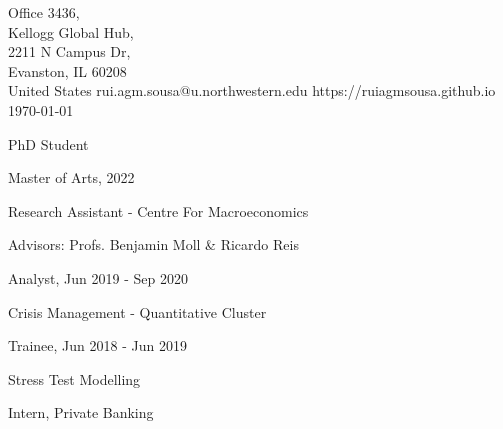\documentclass{practical-resume}
\begin{document}
\namehead

\begin{address}{
	Office 3436, \\
	Kellogg Global Hub, \\
	2211 N Campus Dr, \\
	Evanston, IL 60208 \\
	United States
}
{rui.agm.sousa@u.northwestern.edu}
{https://ruiagmsousa.github.io}
{\today}
\end{address}

\begin{position}{PhD Student}{}
	\item Master of Arts, 2022
\end{position}


	\begin{position}{Research Assistant - }{Centre For Macroeconomics}
		\item Advisors: Profs. Benjamin Moll \& Ricardo Reis
	\end{position}


	\begin{position}{Analyst, }{Jun 2019 - Sep 2020}
		\item Crisis Management - Quantitative Cluster
	\end{position}
	\begin{position}{Trainee, }{Jun 2018 - Jun 2019}
		\item Stress Test Modelling
	\end{position}
		
	\begin{position}[noitemize]{Intern, }{Private Banking}
	\end{position}
	
	
	
\end{document}
